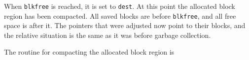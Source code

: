 When \texttt{blkfree} is reached, it is set to \texttt{dest}. At this
point the allocated block region has been compacted. All saved blocks
are before \texttt{blkfree}, and all free space is after it. The
pointers that were adjusted now point to their blocks, and the
relative situation is the same as it was before garbage collection.

The routine for compacting the allocated block region is

